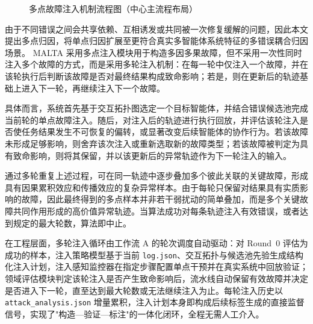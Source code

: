 \begin{figure}[H]
\vspace{5mm}
\caption{多点故障注入机制流程图（中心主流程布局）}
\label{fig:injection}
\end{figure}

由于不同错误之间会共享依赖、互相诱发或共同被一次修复缓解的问题，因此本文提出多点归因，将单点归因扩展至更符合真实多智能体系统特征的多错误耦合归因场景。 MALTA 采用多点注入模块用于构造多因多果故障，但不采用一次性同时注入多个故障的方式，而是采用多轮注入机制：在每一轮中仅注入一个故障，并在该轮执行后判断该故障是否对最终结果构成致命影响；若是，则在更新后的轨迹基础上进入下一轮，再继续注入下一个故障。

具体而言，系统首先基于交互拓扑图选定一个目标智能体，并结合错误候选池完成当前轮的单点故障注入。随后，对注入后的轨迹进行执行回放，并评估该轮注入是否使任务结果发生不可恢复的偏转，或显著改变后续智能体的协作行为。若该故障未形成足够影响，则舍弃该次注入或重新选取新的故障类型；若该故障被判定为具有致命影响，则将其保留，并以该更新后的异常轨迹作为下一轮注入的输入。

通过多轮重复上述过程，可在同一轨迹中逐步叠加多个彼此关联的关键故障，形成具有因果累积效应和传播效应的复杂异常样本。由于每轮只保留对结果具有实质影响的故障，因此最终得到的多点样本并非若干弱扰动的简单叠加，而是多个关键故障共同作用形成的高价值异常轨迹。当算法成功对每条轨迹注入有效错误，或者达到规定的最大轮数，算法即中止。

在工程层面，多轮注入循环由工作流 A 的轮次调度自动驱动：对 Round~0 评估为成功的样本，注入策略模型基于当前 \texttt{log.json}、交互拓扑与候选池先验生成结构化注入计划，注入感知监控器在指定步骤配置单点干预并在真实系统中回放验证；领域评估模块判定该轮注入是否产生致命影响后，流水线自动保留有效故障并决定是否进入下一轮，直至达到最大轮数或无法继续注入为止。每轮注入历史以 \texttt{attack\_analysis.json} 增量累积，注入计划本身即构成后续标签生成的直接监督信号，实现了"构造—验证—标注"的一体化闭环，全程无需人工介入。

